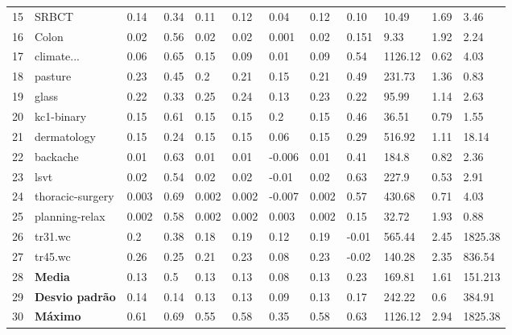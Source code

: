 \documentclass[sn-mathphys,Numbered]{sn-jnl}%
\theoremstyle{thmstyleone}%
\theoremstyle{thmstyletwo}%
\theoremstyle{thmstylethree}%
\begin{document}
\begin{table}[ht]
\begin{tabular}{@{}p{0.1cm}p{2.3cm}p{1.3cm}p{1cm}p{1cm}p{0.8cm}p{1cm}p{1cm}p{0.8cm}p{1cm}p{1cm}p{0.8cm}@{}}
        15 & SRBCT & 0.14 & 0.34 & 0.11 & 0.12 & 0.04 & 0.12 & 0.10 & 10.49 & 1.69 & 3.46 \\
        16 & Colon & 0.02 & 0.56 & 0.02 & 0.02 & 0.001 & 0.02 & 0.151 & 9.33 & 1.92 & 2.24 \\
        17 & climate... & 0.06 & 0.65 & 0.15 & 0.09 & 0.01 & 0.09 & 0.54 & 1126.12 & 0.62 & 4.03 \\
        18 & pasture & 0.23 & 0.45 & 0.2 & 0.21 & 0.15 & 0.21 & 0.49 & 231.73 & 1.36 & 0.83 \\
        19 & glass & 0.22 & 0.33 & 0.25 & 0.24 & 0.13 & 0.23 & 0.22 & 95.99 & 1.14 & 2.63 \\
        20 & kc1-binary & 0.15 & 0.61 & 0.15 & 0.15 & 0.2 & 0.15 & 0.46 & 36.51 & 0.79 & 1.55 \\
        21 & dermatology & 0.15 & 0.24 & 0.15 & 0.15 & 0.06 & 0.15 & 0.29 & 516.92 & 1.11 & 18.14 \\
        22 & backache & 0.01 & 0.63 & 0.01 & 0.01 & -0.006 & 0.01 & 0.41 & 184.8 & 0.82 & 2.36 \\
        23 & lsvt & 0.02 & 0.54 & 0.02 & 0.02 & -0.01 & 0.02 & 0.63 & 227.9 & 0.53 & 2.91 \\
        24 & thoracic-surgery & 0.003 & 0.69 & 0.002 & 0.002 & -0.007 & 0.002 & 0.57 & 430.68 & 0.71 & 4.03 \\
        25 & planning-relax & 0.002 & 0.58 & 0.002 & 0.002 & 0.003 & 0.002 & 0.15 & 32.72 & 1.93 & 0.88 \\
        26 & tr31.wc & 0.2 & 0.38 & 0.18 & 0.19 & 0.12 & 0.19 & -0.01 & 565.44 & 2.45 & 1825.38 \\
        27 & tr45.wc & 0.26 & 0.25 & 0.21 & 0.23 & 0.08 & 0.23 & -0.02 & 140.28 & 2.35 & 836.54 \\
        \midrule
        28 & \textbf{Media} & 0.13 & 0.5 & 0.13 & 0.13 & 0.08 & 0.13 & 0.23 & 169.81 & 1.61 & 151.213 \\
        29 & \textbf{Desvio padrão} & 0.14 & 0.14 & 0.13 & 0.13 & 0.09  & 0.13 & 0.17 & 242.22 & 0.6 & 384.91 \\
        30 & \textbf{Máximo} & 0.61 & 0.69 & 0.55 & 0.58 & 0.35 & 0.58 & 0.63 & 1126.12 & 2.94 & 1825.38 \\
        \bottomrule
    \end{tabular}
    \label{tab:restopk}
\end{table}
\end{document}
